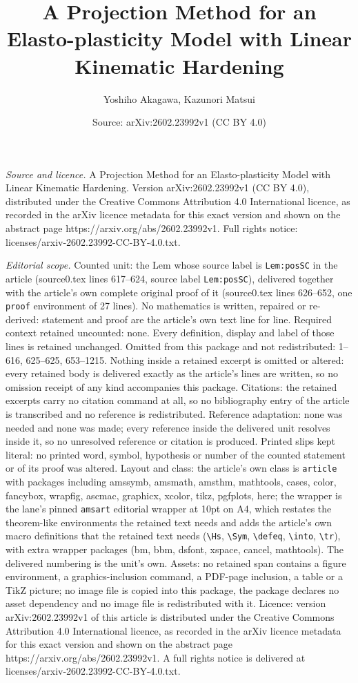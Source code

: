 \documentclass[10pt,a4paper]{amsart}
\title[A Projection Method for an Elasto-plasticity Model with Line]{A Projection Method for an Elasto-plasticity Model with Linear Kinematic Hardening}
\author{Yoshiho Akagawa, Kazunori Matsui}
\date{Source: arXiv:2602.23992v1 (CC BY 4.0)}
\begin{document}
\maketitle

\noindent\emph{Source and licence.} A Projection Method for an Elasto-plasticity Model with Linear Kinematic Hardening. Version arXiv:2602.23992v1 (CC BY 4.0), distributed under the Creative Commons Attribution 4.0 International licence, as recorded in the arXiv licence metadata for this exact version and shown on the abstract page https://arxiv.org/abs/2602.23992v1. Full rights notice: licenses/arxiv-2602.23992-CC-BY-4.0.txt.\par\smallskip

\noindent\textit{Editorial scope.} Counted unit: the Lem whose source label is \texttt{Lem:posSC} in the article (source0.tex lines 617--624, source label \texttt{Lem:posSC}), delivered together with the article's own complete original proof of it (source0.tex lines 626--652, one \texttt{proof} environment of 27 lines). No mathematics is written, repaired or re-derived: statement and proof are the article's own text line for line. Required context retained uncounted: none. Every definition, display and label of those lines is retained unchanged. Omitted from this package and not redistributed: 1--616, 625--625, 653--1215. Nothing inside a retained excerpt is omitted or altered: every retained body is delivered exactly as the article's lines are written, so no omission receipt of any kind accompanies this package. Citations: the retained excerpts carry no citation command at all, so no bibliography entry of the article is transcribed and no reference is redistributed. Reference adaptation: none was needed and none was made; every reference inside the delivered unit resolves inside it, so no unresolved reference or citation is produced. Printed slips kept literal: no printed word, symbol, hypothesis or number of the counted statement or of its proof was altered. Layout and class: the article's own class is \texttt{article} with packages including amssymb, amsmath, amsthm, mathtools, cases, color, fancybox, wrapfig, ascmac, graphicx, xcolor, tikz, pgfplots, here; the wrapper is the lane's pinned \texttt{amsart} editorial wrapper at 10pt on A4, which restates the theorem-like environments the retained text needs and adds the article's own macro definitions that the retained text needs (\texttt{\textbackslash Hs}, \texttt{\textbackslash Sym}, \texttt{\textbackslash defeq}, \texttt{\textbackslash into}, \texttt{\textbackslash tr}), with extra wrapper packages (bm, bbm, dsfont, xspace, cancel, mathtools). The delivered numbering is the unit's own. Assets: no retained span contains a figure environment, a graphics-inclusion command, a PDF-page inclusion, a table or a TikZ picture; no image file is copied into this package, the package declares no asset dependency and no image file is redistributed with it. Licence: version arXiv:2602.23992v1 of this article is distributed under the Creative Commons Attribution 4.0 International licence, as recorded in the arXiv licence metadata for this exact version and shown on the abstract page https://arxiv.org/abs/2602.23992v1. A full rights notice is delivered at licenses/arxiv-2602.23992-CC-BY-4.0.txt. 
\end{document}
